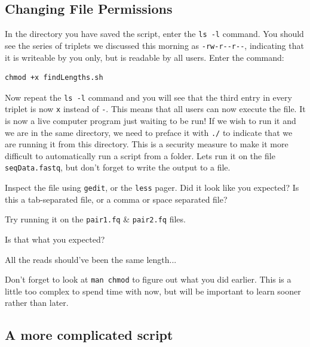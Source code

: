 \documentclass[a4paper,12pt,twoside]{memoir}
\begin{document}
\subsection{Changing File Permissions}
\begin{steps}
In the directory you have saved the script, enter the \texttt{ls -l} command.
You should see the series of triplets we discussed this morning as \texttt{-rw-r-{}-r-{}-}, indicating that it is writeable by you only, but is readable by all users.
Enter the command: \\
\begin{lstlisting}
chmod +x findLengths.sh
\end{lstlisting}
Now repeat the \texttt{ls -l} command and you will see that the third entry in every triplet is now \texttt{x} instead of \texttt{-}.
This means that all users can now execute the file.
It is now a live computer program just waiting to be run!
If we wish to run it and we are in the same directory, we need to preface it with \texttt{./} to indicate that we are running it from this directory.
This is a security measure to make it more difficult to automatically run a script from a folder.
Lets run it on the file \texttt{seqData.fastq}, but don't forget to write the output  to a file.
\end{steps}

\begin{questions}
Inspect the file using \texttt{gedit}, or the \texttt{less} pager.
Did it look like you expected? 
Is this a tab-separated file, or a comma or space separated file?
\end{questions}

\begin{bonus}
Try running it on the \texttt{pair1.fq} \& \texttt{pair2.fq} files.
\begin{questions}
Is that what you expected?
\begin{answer}
All the reads should've been the same length...
\end{answer}
\end{questions}
\end{bonus}

\begin{note}
Don't forget to look at \texttt{man chmod} to figure out what you did earlier.
This is a little too complex to spend time with now, but will be important to learn sooner rather than later.
\end{note}

\clearpage
\subsection*{A more complicated script}
\end{document}
